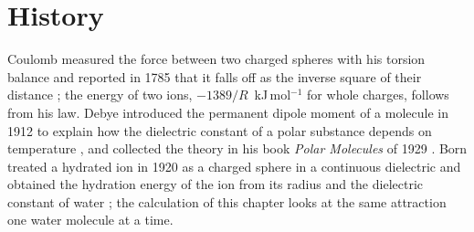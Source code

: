 \section{History}
Coulomb measured the force between two charged spheres with his torsion balance and reported in 1785 that it falls off as the inverse square of their distance \cite{coulomb1785}; the energy of two ions, $-1389/R$~kJ\,mol$^{-1}$ for whole charges, follows from his law. Debye introduced the permanent dipole moment of a molecule in 1912 to explain how the dielectric constant of a polar substance depends on temperature \cite{debye1912}, and collected the theory in his book \emph{Polar Molecules} of 1929 \cite{debye1929}. Born treated a hydrated ion in 1920 as a charged sphere in a continuous dielectric and obtained the hydration energy of the ion from its radius and the dielectric constant of water \cite{born1920}; the calculation of this chapter looks at the same attraction one water molecule at a time.
